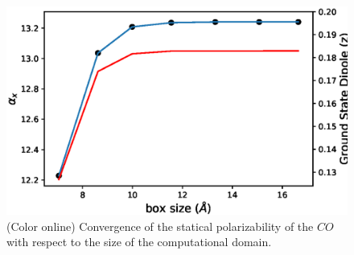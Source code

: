 \documentclass[reprint,aps,prb]{revtex4-1}
\begin{document}
\begin{figure}[t]
\includegraphics[scale=0.56]{CO_alpha+D0_vsBoxSize.eps}
\caption{\label{co_alphaStatic}(Color online) Convergence of the statical polarizability of the $CO$ with respect to the size of the computational domain.}
\end{figure}
\end{document}
